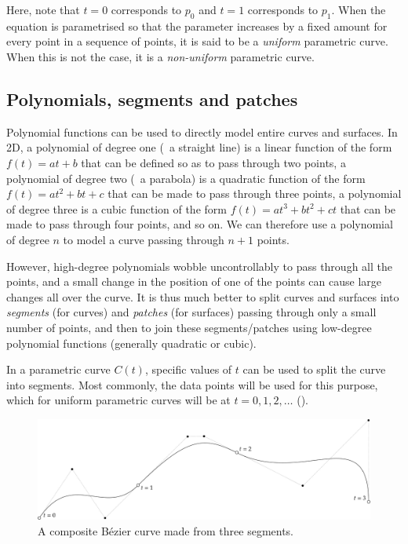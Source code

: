 Here, note that \(t=0\) corresponds to \(p_0\) and \(t=1\) corresponds to \(p_1\).
When the equation is parametrised so that the parameter increases by a fixed amount for every point in a sequence of points, it is said to be a \emph{uniform} parametric curve.
When this is not the case, it is a \emph{non-uniform} parametric curve.

\subsection{Polynomials, segments and patches}

Polynomial functions can be used to directly model entire curves and surfaces.
In 2D, a polynomial of degree one (\ie\ a straight line) is a linear function of the form \(f(t) = at+b\) that can be defined so as to pass through two points, a polynomial of degree two (\ie\ a parabola) is a quadratic function of the form \(f(t)=at^2+bt+c\) that can be made to pass through three points, a polynomial of degree three is a cubic function of the form \(f(t)=at^3+bt^2+ct\) that can be made to pass through four points, and so on.
We can therefore use a polynomial of degree \(n\) to model a curve passing through \(n+1\) points.

However, high-degree polynomials wobble uncontrollably to pass through all the points, and a small change in the position of one of the points can cause large changes all over the curve.
It is thus much better to split curves and surfaces into \emph{segments} (for curves) and \emph{patches} (for surfaces) passing through only a small number of points, and then to join these segments/patches using low-degree polynomial functions (generally quadratic or cubic).

In a parametric curve \(C(t)\), specific values of \(t\) can be used to split the curve into segments.
Most commonly, the data points will be used for this purpose, which for uniform parametric curves will be at \(t = 0, 1, 2, \ldots \) ().

\begin{figure}
\centering
\includegraphics[width=\linewidth]{figs/segments}
\caption{A composite B\'ezier curve made from three segments.}%
\label{fig:segments}
\end{figure}

